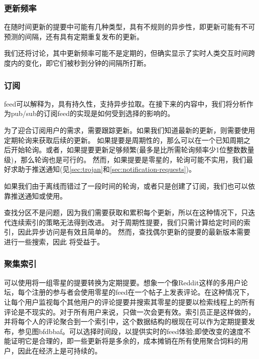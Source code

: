 \subsubsection{更新频率}

在随时间更新的提要中可能有几种类型，具有不规则的异步性，即更新可能有不可预测的间隔，还有具有定期重复发布的更新。

我们还将讨论，其中更新频率可能不是定期的，但确实显示了实时人类交互时间跨度内的变化，即它们被秒到分钟的间隔所打断。

\subsubsection{订阅}

feed可以解释为，具有持久性，支持异步拉取。在接下来的内容中，我们将分析作为pub/sub的订阅feed的实现是如何受到选择的影响的。

为了迎合订阅用户的需求，需要跟踪更新。如果我们知道最新的更新，则需要使用定期轮询来获取后续的更新。
如果提要是周期性的，那么可以在一个已知周期之后开始轮询。或者，如果提要更新足够频繁(最多是比所需轮询频率少1位整数数量级)，那么轮询也是可行的。
然而，如果提要是零星的，轮询可能不实用，我们最好求助于推送通知(见\ref{sec:trojan}和\ref{sec:notification-requests})。

如果我们由于离线而错过了一段时间的轮询，或者只是创建了订阅，我们也可以依靠推送通知或使用。

查找分区不是问题，因为我们需要获取和累积每个更新，所以在这种情况下，只迭代连续索引的策略无法得到改进。
对于周期性提要，我们只需计算给定时间的索引，因此异步访问是有效且简单的。
然而，查找偶尔更新的提要的最新版本需要进行一些搜索，因此
将受益于。



\subsubsection{聚集索引}

可以使用将一组零星的提要转换为定期提要。想象一个像Reddit这样的多用户论坛，每个注册的参与者会使用零星的feed在一个帖子上发表评论。在这种情况下，让每个用户监视每个其他用户的评论提要并搜索其零星的提要以检索线程上的所有评论是不现实的。对于所有用户来说，只做一次会更有效。索引员正是这样做的，并将每个人的评论聚合到一个索引中，这个数据结构的根现在可以作为定期提要发布，参见图bfdbbaf。可以选择时间段，以提供实时的feed体验;即使改变的速度不能证明它是合理的，即一些更新将是多余的，成本摊销在所有使用聚合饲料的用户，因此在经济上是可持续的。 

